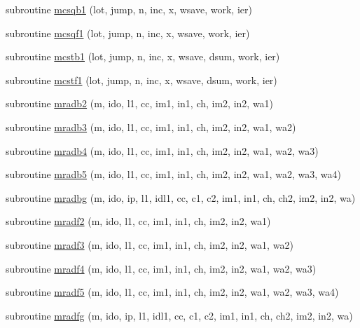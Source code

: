 \begin{DoxyCompactItemize}
\item 
subroutine \mbox{\hyperlink{namespacefftclass_a91e23ffaebaadf2b1c22e689f69996a2}{mcsqb1}} (lot, jump, n, inc, x, wsave, work, ier)
\item 
subroutine \mbox{\hyperlink{namespacefftclass_a05d00644e8642979b2c55b7822bbfb03}{mcsqf1}} (lot, jump, n, inc, x, wsave, work, ier)
\item 
subroutine \mbox{\hyperlink{namespacefftclass_a10f96df2a58ce7f2e6ac9eaddf09588e}{mcstb1}} (lot, jump, n, inc, x, wsave, dsum, work, ier)
\item 
subroutine \mbox{\hyperlink{namespacefftclass_aac5cdc09f4e9979eb972972e1db55cb3}{mcstf1}} (lot, jump, n, inc, x, wsave, dsum, work, ier)
\item 
subroutine \mbox{\hyperlink{namespacefftclass_a39691ebdf781bf380b7ef426f4027896}{mradb2}} (m, ido, l1, cc, im1, in1, ch, im2, in2, wa1)
\item 
subroutine \mbox{\hyperlink{namespacefftclass_a493cf432cfe190657e9a56a0d452b275}{mradb3}} (m, ido, l1, cc, im1, in1, ch, im2, in2, wa1, wa2)
\item 
subroutine \mbox{\hyperlink{namespacefftclass_a5aae50728c25b5089b6b3c61d3ef27eb}{mradb4}} (m, ido, l1, cc, im1, in1, ch, im2, in2, wa1, wa2, wa3)
\item 
subroutine \mbox{\hyperlink{namespacefftclass_a69781205c1568e37470a06e001a0dae7}{mradb5}} (m, ido, l1, cc, im1, in1, ch, im2, in2, wa1, wa2, wa3, wa4)
\item 
subroutine \mbox{\hyperlink{namespacefftclass_ae156d4969bbcc9250a0dc81ee91d3cdf}{mradbg}} (m, ido, ip, l1, idl1, cc, c1, c2, im1, in1, ch, ch2, im2, in2, wa)
\item 
subroutine \mbox{\hyperlink{namespacefftclass_a577b893eadc27ccc53b888490cb1b873}{mradf2}} (m, ido, l1, cc, im1, in1, ch, im2, in2, wa1)
\item 
subroutine \mbox{\hyperlink{namespacefftclass_a4e99b7194e96b9a086f743a98205cc5a}{mradf3}} (m, ido, l1, cc, im1, in1, ch, im2, in2, wa1, wa2)
\item 
subroutine \mbox{\hyperlink{namespacefftclass_aec86b95620b11b4db180468a4f771842}{mradf4}} (m, ido, l1, cc, im1, in1, ch, im2, in2, wa1, wa2, wa3)
\item 
subroutine \mbox{\hyperlink{namespacefftclass_ab6d74e30932fcf82744ac339de050933}{mradf5}} (m, ido, l1, cc, im1, in1, ch, im2, in2, wa1, wa2, wa3, wa4)
\item 
subroutine \mbox{\hyperlink{namespacefftclass_a5741ec7db9519828a0c46df4355b734d}{mradfg}} (m, ido, ip, l1, idl1, cc, c1, c2, im1, in1, ch, ch2, im2, in2, wa)

\end{DoxyCompactItemize}
